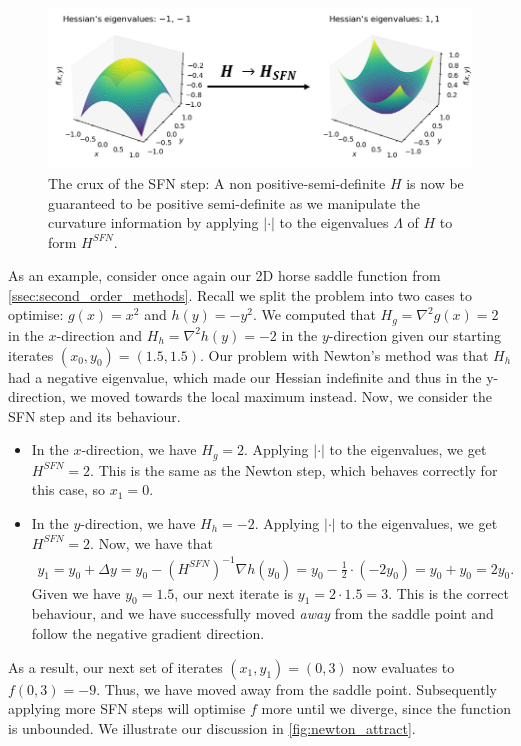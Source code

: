 \begin{figure}
    \centering
    \includegraphics[width=0.8\linewidth]{figures/4method/method_diag_1.png}
    \caption{The crux of the SFN step: A non positive-semi-definite $H$ is now be guaranteed to be positive semi-definite as we manipulate the curvature information by applying $|\cdot|$ to the eigenvalues $\Lambda$ of $H$ to form $H^{SFN}$.}
    \label{fig:guaranteed_pos_def}
\end{figure}

As an example, consider once again our 2D horse saddle function from \cref{ssec:second_order_methods}. Recall we split the problem into two cases to optimise: $g(x) = x^2$ and $h(y) = -y^2$. We computed that $H_g = \nabla^2 g(x) = 2$ in the $x$-direction and $H_h = \nabla^2 h(y) = -2$ in the $y$-direction given our starting iterates $(x_0, y_0) = (1.5, 1.5)$. Our problem with Newton's method was that $H_h$ had a negative eigenvalue, which made our Hessian indefinite and thus in the y-direction, we moved towards the local maximum instead. Now, we consider the SFN step and its behaviour.
\begin{itemize}
    \item In the $x$-direction, we have $H_g = 2$. Applying $|\cdot|$ to the eigenvalues, we get $H^{SFN} = 2$. This is the same as the Newton step, which behaves correctly for this case, so $x_1 = 0$.
    \item In the $y$-direction, we have $H_h = -2$. Applying $|\cdot|$ to the eigenvalues, we get $H^{SFN} = 2$. Now, we have that
    \begin{align}
        y_1 = y_0 + \Delta y = y_0 - (H^{SFN})^{-1} \nabla h(y_0) = y_0 - \frac{1}{2} \cdot (-2 y_0) = y_0 + y_0 = 2y_0.
    \end{align}
    Given we have $y_0 = 1.5$, our next iterate is $y_1 = 2 \cdot 1.5 = 3$. This is the correct behaviour, and we have successfully moved \textit{away} from the saddle point and follow the negative gradient direction.
\end{itemize}
As a result, our next set of iterates $(x_1, y_1) = (0, 3)$ now evaluates to $f(0, 3) = -9$. Thus, we have moved away from the saddle point. Subsequently applying more SFN steps will optimise $f$ more until we diverge, since the function is unbounded. We illustrate our discussion in \cref{fig:newton_attract}.


